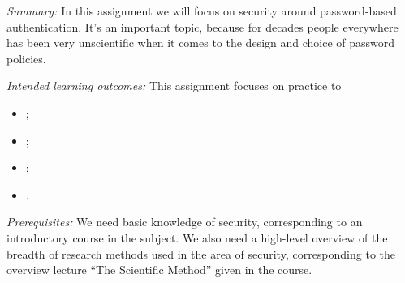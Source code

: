 
\emph{Summary:}
In this assignment we will focus on security around password-based 
authentication.
It's an important topic, because for decades people everywhere has been very 
unscientific when it comes to the design and choice of password 
policies\autocite{Estes2017Aug}.

\emph{Intended learning outcomes:}
This assignment focuses on practice to
\begin{itemize}
  \item \LOrelate;
  \item \LOevaluate;
  \item \LOapply;
  \item \LOcomm.
\end{itemize}

\emph{Prerequisites:}
We need basic knowledge of security, corresponding to an introductory course in 
the subject.
We also need a high-level overview of the breadth of research methods used in 
the area of security, corresponding to the overview lecture \enquote{The 
Scientific Method} given in the course.
